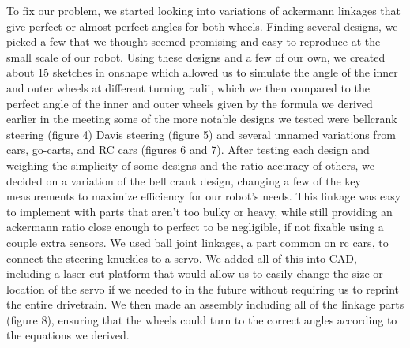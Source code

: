To fix our problem, we started looking into variations of ackermann linkages that give perfect or almost perfect angles for both wheels. Finding several designs, we picked a few that we thought seemed promising and easy to reproduce at the small scale of our robot. Using these designs and a few of our own, we created about 15 sketches in onshape which allowed us to simulate the angle of the inner and outer wheels at different turning radii, which we then compared to the perfect angle of the inner and outer wheels given by the formula we derived earlier in the meeting some of the more notable designs we tested were bellcrank steering (figure 4) Davis steering (figure 5) and several unnamed variations from cars, go-carts, and RC cars (figures 6 and 7). After testing each design and weighing the simplicity of some designs and the ratio accuracy of others, we decided on a variation of the bell crank design, changing a few of the key measurements to maximize efficiency for our robot’s needs. This linkage was easy to implement with parts that aren’t too bulky or heavy, while still providing an ackermann ratio close enough to perfect to be negligible, if not fixable using a couple extra sensors. 
We used ball joint linkages, a part common on rc cars, to connect the steering knuckles to a servo. We added all of this into CAD, including a laser cut platform that would allow us to easily change the size or location of the servo if we needed to in the future without requiring us to reprint the entire drivetrain. We then made an assembly including all of the linkage parts (figure 8), ensuring that the wheels could turn to the correct angles according to the equations we derived. 


 

